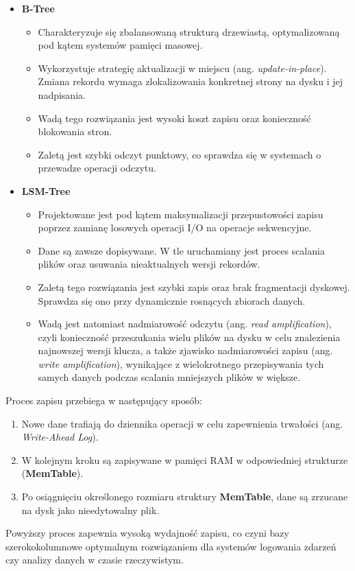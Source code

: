 \begin{itemize}
    \item \textbf{B-Tree} \begin{itemize}
        \item Charakteryzuje się zbalansowaną strukturą drzewiastą, optymalizowaną pod kątem systemów pamięci masowej.
        \item Wykorzystuje strategię aktualizacji w miejscu (ang. \emph{update-in-place}). Zmiana rekordu wymaga zlokalizowania konkretnej strony na dysku i jej nadpisania.
        \item Wadą tego rozwiązania jest wysoki koszt zapisu oraz konieczność blokowania stron.
        \item Zaletą jest szybki odczyt punktowy, co sprawdza się w systemach o przewadze operacji odczytu.
    \end{itemize}
    \item \textbf{LSM-Tree} \begin{itemize}
        \item Projektowane jest pod kątem maksymalizacji przepustowości zapisu poprzez zamianę losowych operacji I/O na operacje sekwencyjne.
        \item Dane są zawsze dopisywane. W tle uruchamiany jest proces scalania plików oraz usuwania nieaktualnych wersji rekordów.
        \item Zaletą tego rozwiązania jest szybki zapis oraz brak fragmentacji dyskowej. Sprawdza się ono przy dynamicznie rosnących zbiorach danych.
        \item Wadą jest natomiast nadmiarowość odczytu (ang. \emph{read amplification}), czyli konieczność przeszukania wielu plików na dysku w celu znalezienia najnowszej wersji klucza, a także zjawisko nadmiarowości zapisu (ang. \emph{write amplification}), wynikające z wielokrotnego przepisywania tych samych danych podczas scalania mniejszych plików w większe.
    \end{itemize} 
\end{itemize}

Proces zapisu przebiega w następujący sposób:
\begin{enumerate}
    \item Nowe dane trafiają do dziennika operacji w celu zapewnienia trwałości (ang. \emph{Write-Ahead Log}).
    \item W kolejnym kroku są zapisywane w pamięci RAM w odpowiedniej strukturze (\textbf{MemTable}).
    \item Po osiągnięciu określonego rozmiaru struktury \textbf{MemTable}, dane są zrzucane na dysk jako nieedytowalny plik.
\end{enumerate}
Powyższy proces zapewnia wysoką wydajność zapisu, co czyni bazy szerokokolumnowe optymalnym rozwiązaniem dla systemów logowania zdarzeń czy analizy danych w czasie rzeczywistym.

